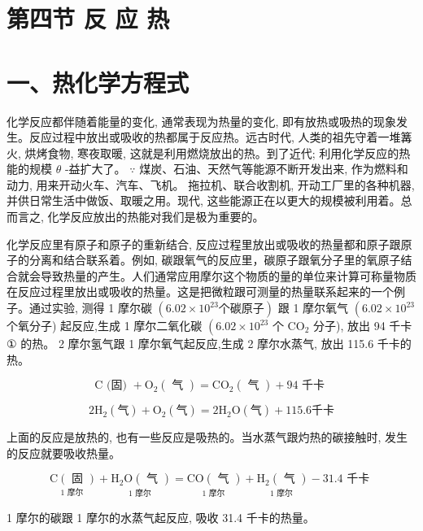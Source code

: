 \documentclass[10pt]{article}
\begin{document}
\section*{第四节 反 应 热}

\section*{一、热化学方程式}

化学反应都伴随着能量的变化, 通常表现为热量的变化, 即有放热或吸热的现象发生。反应过程中放出或吸收的热都属于反应热。远古时代, 人类的祖先守着一堆篝火, 烘烤食物, 寒夜取暖, 这就是利用燃烧放出的热。到了近代; 利用化学反应的热能的规模 \(\theta\) -益扩大了。 \(\because\) 煤炭、石油、天然气等能源不断开发出来, 作为燃料和动力, 用来开动火车、汽车、飞机。 拖拉机、联合收割机, 开动工厂里的各种机器, 并供日常生活中做饭、取暖之用。现代, 这些能源正在以更大的规模被利用着。总而言之, 化学反应放出的热能对我们是极为重要的。

化学反应里有原子和原子的重新结合, 反应过程里放出或吸收的热量都和原子跟原子的分离和结合联系着。例如, 碳跟氧气的反应里，碳原子跟氧分子里的氧原子结合就会导致热量的产生。人们通常应用摩尔这个物质的量的单位来计算可称量物质在反应过程里放出或吸收的热量。这是把微粒跟可测量的热量联系起来的一个例子。通过实验, 测得 1 摩尔碳 \(\left( {{6.02} \times {10}^{23}\text{个碳原子}}\right)\) 跟 1 摩尔氧气 \(\left( {{6.02} \times {10}^{23}}\right.\) 个氧分子) 起反应,生成 1 摩尔二氧化碳 \(\left( {{6.02} \times {10}^{23}}\right.\) 个 \({\mathrm{{CO}}}_{2}\) 分子), 放出 94 千卡 \(\text{①}\) 的热。 2 摩尔氢气跟 1 摩尔氧气起反应,生成 2 摩尔水蒸气, 放出 115.6 千卡的热。

\[
\mathrm{C}\text{ (固) } + {\mathrm{O}}_{2}\left( \text{ 气 }\right) = {\mathrm{{CO}}}_{2}\left( \text{ 气 }\right) + {94}\text{ 千卡 }
\]

\[
2{\mathrm{H}}_{2}\left( \text{气}\right) + {\mathrm{O}}_{2}\left( \text{气}\right) = 2{\mathrm{H}}_{2}\mathrm{O}\left( \text{气}\right) + {115.6}\text{千卡}
\]

上面的反应是放热的, 也有一些反应是吸热的。当水蒸气跟灼热的碳接触时, 发生的反应就要吸收热量。

\[
\underset{1\text{ 摩尔 }}{\mathrm{C}\left( \text{ 固 }\right) } + \underset{1\text{ 摩尔 }}{{\mathrm{H}}_{2}\mathrm{O}\left( \text{ 气 }\right) } = \underset{1\text{ 摩尔 }}{\mathrm{{CO}}\left( \text{ 气 }\right) } + \underset{1\text{ 摩尔 }}{{\mathrm{H}}_{2}\left( \text{ 气 }\right) } - {31.4}\text{ 千卡 }
\]

1 摩尔的碳跟 1 摩尔的水蒸气起反应, 吸收 31.4 千卡的热量。
\end{document}

